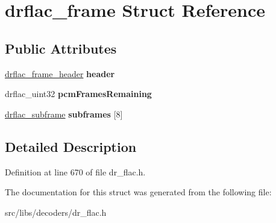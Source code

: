 \hypertarget{structdrflac__frame}{\section{drflac\-\_\-frame Struct Reference}
\label{structdrflac__frame}
}
\subsection*{Public Attributes}
\begin{DoxyCompactItemize}
\item 
\hypertarget{structdrflac__frame_a0c1c7ba3aeb2a987e0812f38b4974399}{\hyperlink{structdrflac__frame__header}{drflac\-\_\-frame\-\_\-header} {\bfseries header}}\label{structdrflac__frame_a0c1c7ba3aeb2a987e0812f38b4974399}

\item 
\hypertarget{structdrflac__frame_a1866b7d908ef1ed678e7bd138f608582}{drflac\-\_\-uint32 {\bfseries pcm\-Frames\-Remaining}}\label{structdrflac__frame_a1866b7d908ef1ed678e7bd138f608582}

\item 
\hypertarget{structdrflac__frame_aa50de16bb64d5830fc278bb390bfc4a9}{\hyperlink{structdrflac__subframe}{drflac\-\_\-subframe} {\bfseries subframes} \mbox{[}8\mbox{]}}\label{structdrflac__frame_aa50de16bb64d5830fc278bb390bfc4a9}

\end{DoxyCompactItemize}


\subsection{Detailed Description}


Definition at line 670 of file dr\-\_\-flac.\-h.



The documentation for this struct was generated from the following file\-:\begin{DoxyCompactItemize}
\item 
src/libs/decoders/dr\-\_\-flac.\-h\end{DoxyCompactItemize}
